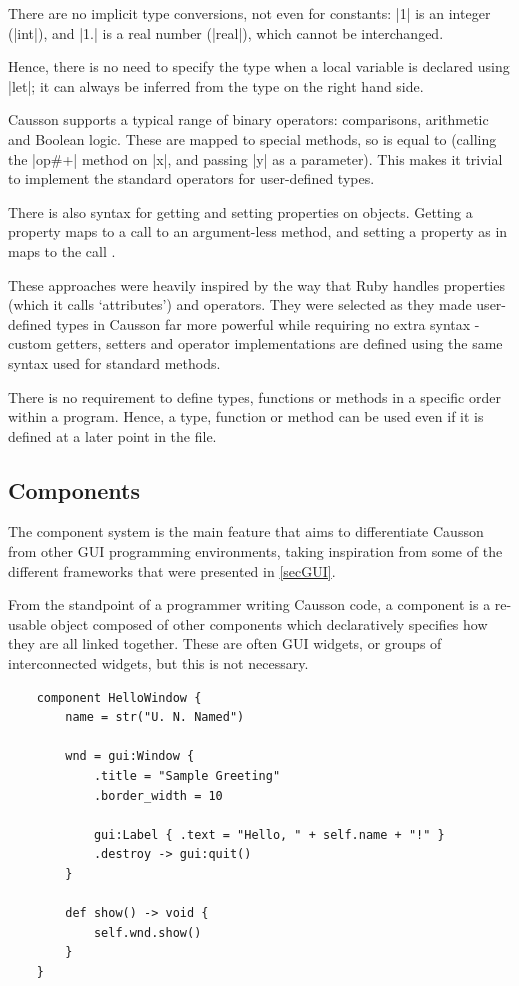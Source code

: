 \documentclass[11pt]{report}
\begin{document}
There are no implicit type conversions, not even for constants: |1| is an integer (|int|), and |1.| is a real number (|real|), which cannot be interchanged.

Hence, there is no need to specify the type when a local variable is declared using |let|; it can always be inferred from the type on the right hand side.

Causson supports a typical range of binary operators: comparisons, arithmetic and Boolean logic. These are mapped to special methods, so  is equal to  (calling the |op#+| method on |x|, and passing |y| as a parameter). This makes it trivial to implement the standard operators for user-defined types.

There is also syntax for getting and setting properties on objects. Getting a property  maps to a call to an argument-less  method, and setting a property as in  maps to the call .

These approaches were heavily inspired by the way that Ruby handles properties (which it calls `attributes') and operators. They were selected as they made user-defined types in Causson far more powerful while requiring no extra syntax - custom getters, setters and operator implementations are defined using the same syntax used for standard methods.

There is no requirement to define types, functions or methods in a specific order within a program. Hence, a type, function or method can be used even if it is defined at a later point in the file.

\subsection{Components}

The component system is the main feature that aims to differentiate Causson from other GUI programming environments, taking inspiration from some of the different frameworks that were presented in \cref{secGUI}.

From the standpoint of a programmer writing Causson code, a component is a re-usable object composed of other components which declaratively specifies how they are all linked together. These are often GUI widgets, or groups of interconnected widgets, but this is not necessary.

\begin{Verbatim}
    component HelloWindow {
        name = str("U. N. Named")
        
        wnd = gui:Window {
            .title = "Sample Greeting"
            .border_width = 10
            
            gui:Label { .text = "Hello, " + self.name + "!" }
            .destroy -> gui:quit()
        }
        
        def show() -> void {
            self.wnd.show()
        }
    }
\end{Verbatim}
\end{document}
